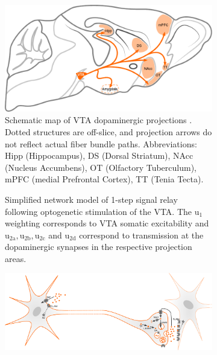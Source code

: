\begin{sansmath}
\begin{figure}[h!]
	\centering
	\hspace*{\fill}
	\begin{subfigure}{.527\textwidth}
		\centering
		\vspace{-1em}
		\includegraphics[width=\textwidth]{img/model_literature}
		\caption{
			Schematic map of VTA dopaminergic projections \cite{Aransay2015,Fields2007,Ikemoto2007,Pan2010}.
			Dotted structures are off-slice, and projection arrows do not reflect actual fiber bundle paths.
			Abbreviations: Hipp (Hippocampus), DS (Dorsal Striatum), NAcc (Nucleus Accumbens), OT (Olfactory Tuberculum), mPFC (medial Prefrontal Cortex), TT (Tenia Tecta).
			}
		\label{fig:ml}
	\end{subfigure}\hfill
	\begin{subfigure}{.44\textwidth}
		\centering
		\vspace{-2em}
		\vspace{-2em}
		\caption{
			Simplified network model of 1-step signal relay following optogenetic stimulation of the VTA.
			The $\mathrm{u_1}$ weighting corresponds to VTA somatic excitability and $\mathrm{u_{2a},u_{2b},u_{2c}}$ and $\mathrm{u_{2d}}$ correspond to transmission at the dopaminergic synapses in the respective projection areas.
			}
		\label{fig:nm}
	\end{subfigure}
	\hspace*{\fill}
	\begin{subfigure}{.985\textwidth}
		\centering
		\vspace{.5em}
		\includegraphics[width=\textwidth]{img/da}

\end{subfigure}
\end{figure}
\end{sansmath}

